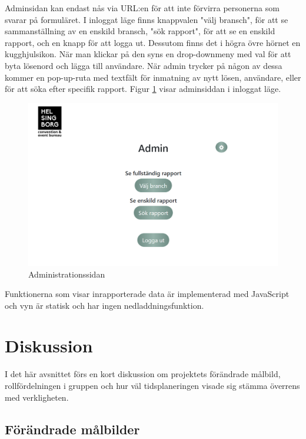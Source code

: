 \documentclass[12pt]{article}
\begin{document}
Adminsidan kan endast nås via URL:en för att inte förvirra personerna som svarar på formuläret. I inloggat läge finns knappvalen "välj bransch", för att se sammanställning av en enskild bransch, "sök rapport", för att se en enskild rapport, och en knapp för att logga ut. Dessutom finns det i högra övre hörnet en kugghjulsikon. När man klickar på den syns en drop-downmeny med val för att byta lösenord och lägga till användare. När admin trycker på någon av dessa kommer en pop-up-ruta med textfält för inmatning av nytt lösen, användare, eller för att söka efter specifik rapport. Figur \ref{fig:admin_index} visar adminsiddan i inloggat läge.

\begin{figure}[H]
    \centering
    \includegraphics[width=12cm]{admin_index.png}
    \caption{Administrationssidan}
    \label{fig:admin_index}
\end{figure}

Funktionerna som visar inrapporterade data är implementerad med JavaScript och vyn är statisk och har ingen nedladdningsfunktion.
\newpage
\section{Diskussion}
I det här avsnittet förs en kort diskussion om projektets förändrade målbild, rollfördelningen i gruppen och hur väl tidsplaneringen visade sig stämma överrens med verkligheten.
\subsection{Förändrade målbilder}
\end{document}
